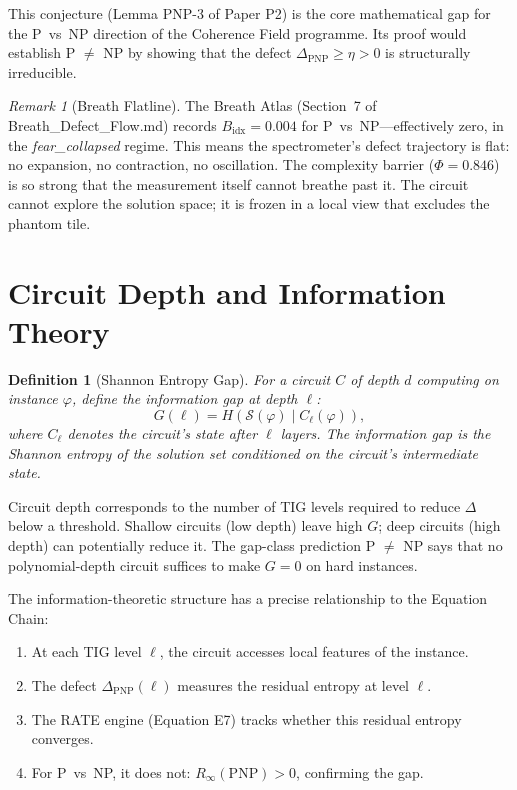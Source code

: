 \documentclass[12pt, openany]{book}
\newtheorem{definition}[theorem]{Definition}
\theoremstyle{remark}
\newtheorem{remark}[theorem]{Remark}
\begin{document}
\noindent
This conjecture (Lemma PNP-3 of Paper P2) is the core mathematical gap for the
P~vs~NP direction of the Coherence Field programme.  Its proof would establish
P $\neq$ NP by showing that the defect $\Delta_{\mathrm{PNP}} \geq \eta > 0$
is structurally irreducible.

\begin{remark}[Breath Flatline]
The Breath Atlas (Section~7 of Breath\_Defect\_Flow.md) records
$B_{\mathrm{idx}} = 0.004$ for P~vs~NP---effectively zero, in the
\emph{fear\_collapsed} regime.  This means the spectrometer's defect
trajectory is flat: no expansion, no contraction, no oscillation.
The complexity barrier ($\Phi = 0.846$) is so strong that the measurement
itself cannot breathe past it.  The circuit cannot explore the solution
space; it is frozen in a local view that excludes the phantom tile.
\end{remark}


\section{Circuit Depth and Information Theory}
\label{sec:circuit-info}

\begin{definition}[Shannon Entropy Gap]
\label{def:shannon-gap}
For a circuit $C$ of depth $d$ computing on instance $\varphi$, define the
\emph{information gap} at depth $\ell$:
\[
  G(\ell) = H(\mathcal{S}(\varphi) \mid C_\ell(\varphi)),
\]
where $C_\ell$ denotes the circuit's state after $\ell$ layers.  The information
gap is the Shannon entropy of the solution set conditioned on the circuit's
intermediate state.
\end{definition}

\noindent
Circuit depth corresponds to the number of TIG levels required to reduce $\Delta$
below a threshold.  Shallow circuits (low depth) leave high $G$; deep circuits
(high depth) can potentially reduce it.  The gap-class prediction P $\neq$ NP
says that no polynomial-depth circuit suffices to make $G = 0$ on hard instances.

The information-theoretic structure has a precise relationship to the Equation
Chain:
\begin{enumerate}
  \item At each TIG level $\ell$, the circuit accesses local features of the instance.
  \item The defect $\Delta_{\mathrm{PNP}}(\ell)$ measures the residual entropy at level $\ell$.
  \item The RATE engine (Equation E7) tracks whether this residual entropy converges.
  \item For P~vs~NP, it does not: $R_\infty(\mathrm{PNP}) > 0$, confirming the gap.
\end{enumerate}
\end{document}
